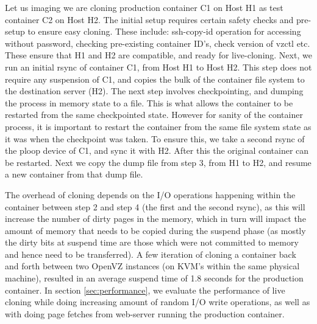 \begin{example}
Let us imaging we are cloning production container C1 on Host H1 as test container C2 on Host H2. 
The initial setup requires certain safety checks and pre-setup to ensure easy cloning. These include: ssh-copy-id operation for accessing without password, checking pre-existing container ID's, check version of vzctl etc. 
These ensure that H1 and H2 are compatible, and ready for live-cloning.
Next, we run an initial rsync of container C1, from Host H1 to Host H2. 
This step does not require any suspension of C1, and copies the bulk of the container file system to the destination server (H2). 
The next step involves checkpointing, and dumping the process in memory state to a file.
This is what allows the container to be restarted from the same checkpointed state. 
However for sanity of the container process, it is important to restart the container from the same file system state as it was when the checkpoint was taken.
To ensure this, we take a second rsync of the ploop device of C1, and sync it with H2.
After this the original container can be restarted.
Next we copy the dump file from step 3, from H1 to H2, and resume a new container from that dump file.
\end{example}

The overhead of cloning depends on the I/O operations happening within the container between step 2 and step 4 (the first and the second rsync), as this will increase the number of dirty pages in the memory, which in turn will impact the amount of memory that needs to be copied during the suspend phase (as mostly the dirty bits at suspend time are those which were not committed to memory and hence need to be transferred).  
A few iteration of cloning a container back and forth between two OpenVZ instances (on KVM's within the same physical machine), resulted in an average suspend time of 1.8 seconds for the production container.
In section \ref{sec:performance}, we evaluate the performance of live cloning while doing increasing amount of random I/O write operations, as well as with doing page fetches  from web-server running the production container.

